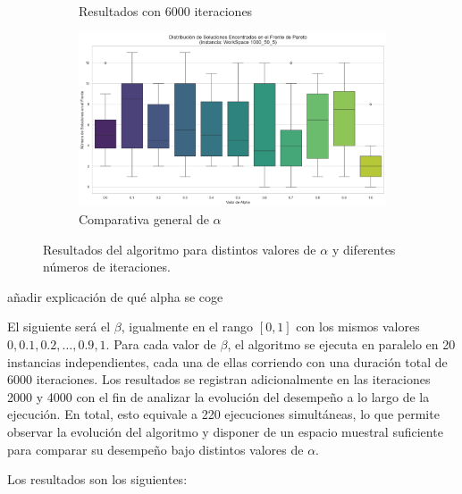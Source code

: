 \documentclass[12pt,a4paper]{book}
\begin{document}
\begin{figure}[H]
\begin{subfigure}{0.45\textwidth}
        \caption{Resultados con 6000 iteraciones}
        \label{fig:alpha_6000}
    \end{subfigure}
    \hfill
    \begin{subfigure}{0.45\textwidth}
        \centering
        \includegraphics[width=\linewidth]{images_finetuning/alphas}
        \caption{Comparativa general de $\alpha$}
        \label{fig:alphas}
    \end{subfigure}
    \caption{Resultados del algoritmo para distintos valores de $\alpha$ y diferentes números de iteraciones.}
    \label{fig:resultados_alpha}
\end{figure}

\color{red} añadir explicación de qué alpha se coge \color{black}

El siguiente será el $\beta$, igualmente en el rango $[0,1]$ con los mismos valores $0, 0.1, 0.2, \dots, 0.9, 1$.  
Para cada valor de $\beta$, el algoritmo se ejecuta en paralelo en 20 instancias independientes, cada una de ellas corriendo con una duración total de 6000 iteraciones. Los resultados se registran adicionalmente en las iteraciones 2000 y 4000 con el fin de analizar la evolución del desempeño a lo largo de la ejecución.
En total, esto equivale a 220 ejecuciones simultáneas, lo que permite observar la evolución del algoritmo y disponer de un espacio muestral suficiente para comparar su desempeño bajo distintos valores de $\alpha$.

Los resultados son los siguientes:
\end{document}

